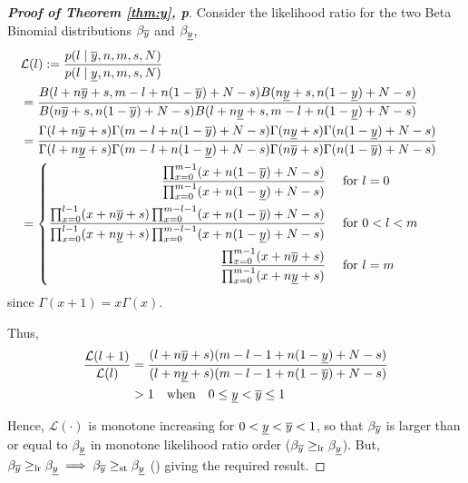 \documentclass[12pt, a4paper]{elsarticle}
\begin{document}
\begin{proof}[\textbf{Proof of Theorem \ref{thm:y}, p\pageref{thm:y}}]
  \label{prf:y}
  Consider the likelihood ratio for the two Beta Binomial distributions $\beta_{\overline{y}}$ and $\beta_{\underline{y}}$,
  \begin{align*}
    \lefteqn{\mathcal{L}(l) := \frac{p(l \mid \yu, n, m, s, N)}{p(l \mid \yl, n, m, s, N)}} \\
    &= \frac{B(l + n \yu + s, m - l + n (1 - \yu) + N - s) B(n \yl + s, n (1 - \yl) + N - s)}
            {B(n \yu + s, n (1 - \yu) + N - s) B(l + n \yl + s, m - l + n (1 - \yl) + N - s)} \\
    &= \frac{\Gamma(l + n \yu + s) \Gamma(m - l + n (1 - \yu) + N - s) \Gamma(n \yl + s) \Gamma(n (1 - \yl) + N - s)}
            {\Gamma(l + n \yl + s) \Gamma(m - l + n (1 - \yl) + N - s) \Gamma(n \yu + s) \Gamma(n (1 - \yu) + N - s)} \\
    &= \left\{ \begin{aligned}
         \frac{\prod_{x=0}^{m-1} (x + n (1 - \yu) + N - s)}
              {\prod_{x=0}^{m-1} (x + n (1 - \yl) + N - s)} &\quad\mbox{ for } l=0 \\
         \frac{\prod_{x=0}^{l-1} (x + n \yu + s) \prod_{x=0}^{m-l-1} (x + n (1 - \yu) + N - s)}
              {\prod_{x=0}^{l-1} (x + n \yl + s) \prod_{x=0}^{m-l-1} (x + n (1 - \yl) + N - s)} &\quad\mbox{ for } 0<l<m \\
         \frac{\prod_{x=0}^{m-1} (x + n \yu + s)}
              {\prod_{x=0}^{m-1} (x + n \yl + s)} &\quad\mbox{ for } l=m
       \end{aligned} \right.
  \end{align*}
  since $\Gamma(x+1)=x \Gamma(x)$.
  
  Thus,
  \begin{align*}
    \frac{\mathcal{L}(l+1)}{\mathcal{L}(l)} &=
      \frac{(l + n \overline{y} + s) (m - l - 1 + n (1 - \underline{y}) + N - s)}
           {(l + n \underline{y} + s) (m - l - 1 + n (1 - \overline{y}) + N - s)} \\
    &> 1 \quad\mbox{when}\quad 0 \le \underline{y} < \overline{y} \le 1
  \end{align*}
    
  Hence, $\mathcal{L}(\cdot)$ is monotone increasing for $0 < \underline{y} < \overline{y} < 1$, so that $\beta_{\overline{y}}$ is larger than or equal to $\beta_{\underline{y}}$ in monotone likelihood ratio order ($\beta_{\overline{y}} \ge_\mathrm{lr} \beta_{\underline{y}}$).  But, $\beta_{\overline{y}} \ge_\mathrm{lr} \beta_{\underline{y}} \implies \beta_{\overline{y}} \ge_\mathrm{st} \beta_{\underline{y}}$ (\cite[Theorem 1.C.1, p.43]{shaked2007}) giving the required result.
\end{proof}
\end{document}

